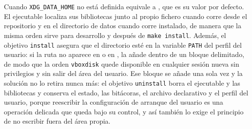 Cuando \texttt{XDG\_DATA\_HOME} no está definida equivale a , que es su valor por defecto. El ejecutable localiza sus bibliotecas junto al propio fichero cuando corre desde el repositorio y en el directorio de datos cuando corre instalado, de manera que la misma orden sirve para desarrollo y después de \texttt{make install}. Además, el objetivo \texttt{install} asegura que el directorio  esté en la variable \texttt{PATH} del perfil del usuario: si la ruta no aparece en  o en , la añade dentro de un bloque delimitado, de modo que la orden \texttt{vboxdisk} quede disponible en cualquier sesión nueva sin privilegios y sin salir del área del usuario. Ese bloque se añade una sola vez y la solución no lo retira nunca más: el objetivo \texttt{uninstall} borra el ejecutable y las bibliotecas y conserva el estado, las bitácoras, el archivo declarativo y el perfil del usuario, porque reescribir la configuración de arranque del usuario es una operación delicada que queda bajo su control, y así también lo exige el principio de no escribir fuera del área propia.
